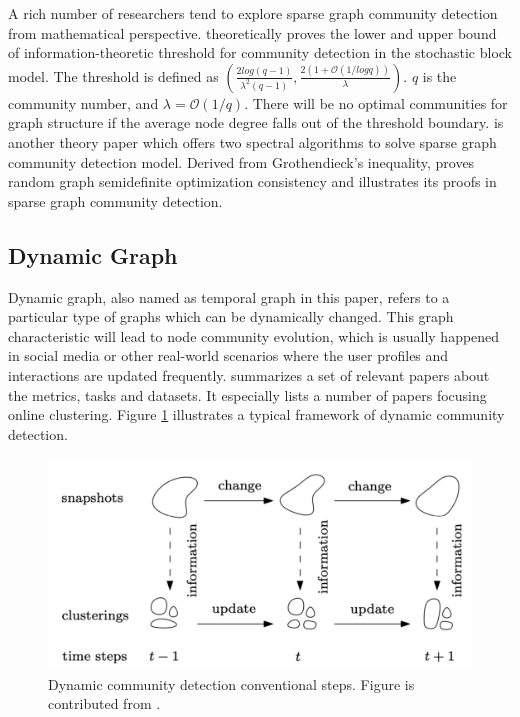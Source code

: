 A rich number of researchers tend to explore sparse graph community detection from mathematical perspective. \cite{banks2016information} theoretically proves the lower and upper bound of information-theoretic threshold for community detection in the stochastic block model. The threshold is defined as $(\frac{2log(q-1)}{\lambda^2(q-1)}, \frac{2(1+\mathcal{O}(1/logq))}{\lambda})$.  $q$ is the community number, and $\lambda = \mathcal{O}(1/q)$. There will be no optimal communities for graph structure if the average node degree falls out of the threshold boundary. \cite{chin2015stochastic} is another theory paper which offers two spectral algorithms to solve sparse graph community detection model. Derived from Grothendieck’s inequality, \cite{guedon2016community} proves random graph semidefinite optimization consistency and illustrates its proofs in sparse graph community detection. 

\subsection{Dynamic Graph}

Dynamic graph, also named as temporal graph in this paper, refers to a particular type of graphs which can be dynamically changed. This graph characteristic will lead to node community evolution, which is usually happened in social media or other real-world scenarios where the user profiles and interactions are updated frequently. \cite{hartmann2016clustering} summarizes a set of relevant papers  about the metrics, tasks and datasets. It especially lists a number of papers focusing online clustering. Figure \ref{fig:c2_dynamic} illustrates a typical framework of dynamic community detection.
 
 \begin{figure}
 	\center
 	\includegraphics[width=0.9\columnwidth]{img/chapter2/dynamic.pdf} 
 	\caption{Dynamic community detection conventional steps. Figure is contributed from \cite{hartmann2016clustering}.}
 	\label{fig:c2_dynamic}
 \end{figure}  

